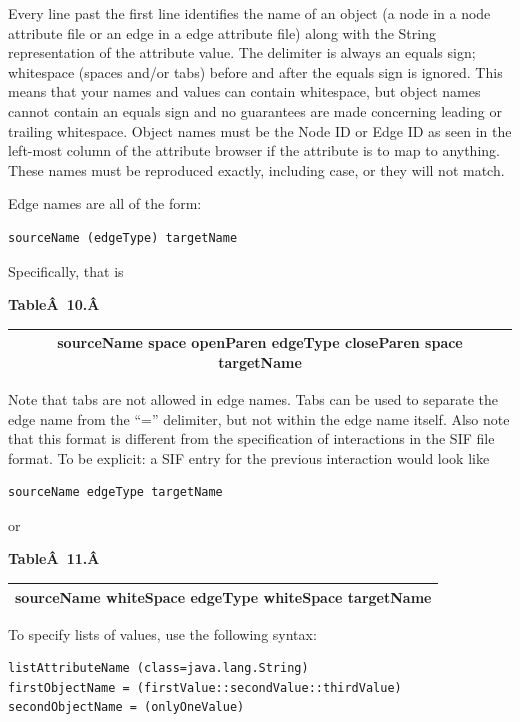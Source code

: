  Every line past the first line identifies the name of an object (a node in a
node attribute file or an edge in a edge attribute file) along with the String
representation of the attribute value. The delimiter is always an equals sign;
whitespace (spaces and/or tabs) before and after the equals sign is ignored.
This means that your names and values can contain whitespace, but object names
cannot contain an equals sign and no guarantees are made concerning leading or
trailing whitespace. Object names must be the Node ID or Edge ID as seen in the
left-most column of the attribute browser if the attribute is to map to
anything. These names must be reproduced exactly, including case, or they will
not match. 

Edge names are all of the form: 

 \begin{verbatim}
sourceName (edgeType) targetName
\end{verbatim}

 Specifically, that is 

 \textbf{Table\^A 10.\^A }

\begin{tabular}{|c|}
 \hline 
 sourceName space openParen edgeType closeParen space targetName \\
 \hline 
\end{tabular}

 Note that tabs are not allowed in edge names. Tabs can be used to separate the
edge name from the ``='' delimiter, but not within the edge name itself. Also
note that this format is different from the specification of interactions in
the SIF file format. To be explicit: a SIF entry for the previous interaction
would look like 

 \begin{verbatim}
sourceName edgeType targetName
\end{verbatim}

 or 

 \textbf{Table\^A 11.\^A }
\begin{tabular}{|c|}
\hline 
 sourceName whiteSpace edgeType whiteSpace targetName \\
\hline 
\end{tabular}

 To specify lists of values, use the following syntax: 

 \begin{verbatim}
listAttributeName (class=java.lang.String)
firstObjectName = (firstValue::secondValue::thirdValue)
secondObjectName = (onlyOneValue)
\end{verbatim}


